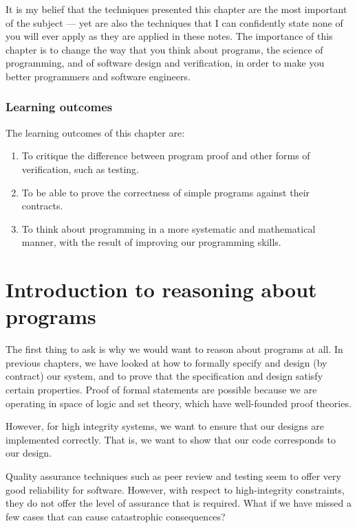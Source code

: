It is my belief that the techniques presented  this chapter are the most important of the subject --- yet are also the techniques that I can confidently state none of you will ever apply as they are applied in these notes. The importance of this chapter is to change the way that you think about programs, the science of programming, and of software design and verification, in order to make you better programmers and software engineers.

\subsubsection*{Learning outcomes}

The learning outcomes of this chapter are:

\begin{enumerate}

 \item To critique the difference between program proof and other forms of verification, such as testing.

 \item To be able to prove the correctness of simple programs against their contracts.

 \item To think about programming in a more systematic and mathematical manner, with the result of improving our programming skills.

\end{enumerate}

\section{Introduction to reasoning about programs}

The first thing to ask is why we would want to reason about programs at all.  In previous chapters, we have looked at how to formally specify and design (by contract) our system, and to prove that the specification and  design satisfy certain properties. Proof of formal statements are possible because we are operating in space of logic and set theory, which have well-founded proof theories.

However, for high integrity systems, we want to ensure that our designs are implemented correctly. That is, we want to show that our code corresponds to our design.

Quality assurance techniques such as peer review and testing seem to offer very good reliability for software. However, with respect to high-integrity constraints, they do not offer the level of assurance that is required. What if we have missed a few cases that can cause catastrophic consequences?

